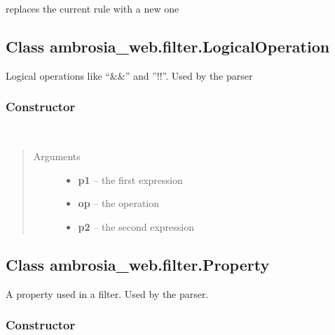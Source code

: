 \documentclass[letterpaper,10pt,english]{sphinxmanual}
\begin{document}
replaces the current rule with a new one


\subsection{Class ambrosia\_web.filter.LogicalOperation}
\label{ambrosia_web.filter.LogicalOperation:class-ambrosia-web-filter-logicaloperation}\label{ambrosia_web.filter.LogicalOperation::doc}
Logical operations like ``\&\&'' and ''!!''. Used by the parser


\subsubsection{Constructor}
\label{ambrosia_web.filter.LogicalOperation:constructor}

\begin{fulllineitems}
\label{ambrosia_web.filter.LogicalOperation:ambrosia_web.filter.LogicalOperation}~\begin{quote}\begin{description}
\item[{Arguments}] \leavevmode\begin{itemize}
\item {} 
\textbf{p1} -- the first expression

\item {} 
\textbf{op} -- the operation

\item {} 
\textbf{p2} -- the second expression

\end{itemize}

\end{description}\end{quote}

\end{fulllineitems}



\subsection{Class ambrosia\_web.filter.Property}
\label{ambrosia_web.filter.Property:class-ambrosia-web-filter-property}\label{ambrosia_web.filter.Property::doc}
A property used in a filter. Used by the parser.


\subsubsection{Constructor}
\label{ambrosia_web.filter.Property:constructor}
\end{document}
